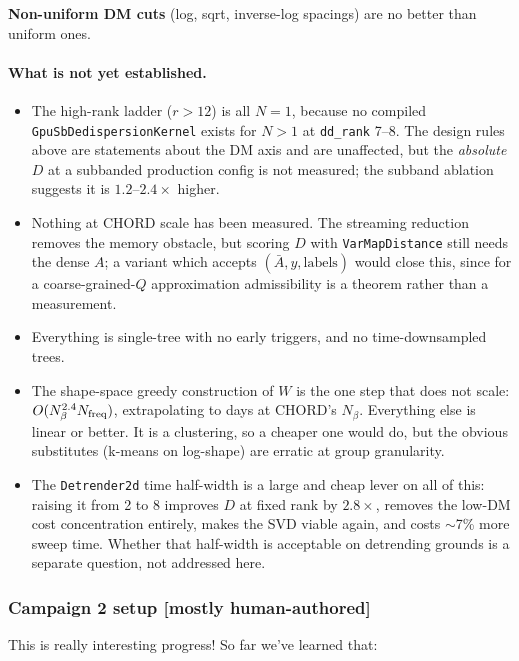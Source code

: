 \documentclass{article}
\numberwithin{equation}{section}   %
\begin{document}
{\bf Non-uniform DM cuts} (log, sqrt, inverse-log spacings) are no better than uniform ones.

\paragraph*{What is not yet established.}
\begin{itemize}
\item The high-rank ladder ($r > 12$) is all $N=1$, because no compiled
 {\tt GpuSbDedispersionKernel} exists for $N>1$ at {\tt dd\_rank} 7--8. The design rules above
 are statements about the DM axis and are unaffected, but the {\em absolute} $D$ at a subbanded
 production config is not measured; the subband ablation suggests it is $1.2$--$2.4\times$
 higher.
\item Nothing at CHORD scale has been measured. The streaming reduction removes the memory
 obstacle, but scoring $D$ with \verb|VarMapDistance| still needs the dense $A$; a variant which
 accepts $(\bar A, y, \mbox{labels})$ would close this, since for a coarse-grained-$Q$
 approximation admissibility is a theorem rather than a measurement.
\item Everything is single-tree with no early triggers, and no time-downsampled trees.
\item The shape-space greedy construction of $W$ is the one step that does not scale:
 $O(N_\beta^{2.4} N_{\rm freq})$, extrapolating to days at CHORD's $N_\beta$. Everything else is linear
 or better. It is a clustering, so a cheaper one would do, but the obvious substitutes
 (k-means on log-shape) are erratic at group granularity.
\item The {\tt Detrender2d} time half-width is a large and cheap lever on all of this: raising it
 from 2 to 8 improves $D$ at fixed rank by $2.8\times$, removes the low-DM cost concentration
 entirely, makes the SVD viable again, and costs $\sim$7\% more sweep time. Whether that
 half-width is acceptable on detrending grounds is a separate question, not addressed here.
\end{itemize}

\subsubsection{Campaign 2 setup [mostly human-authored]}
\label{ssec:campaign2_setup}

This is really interesting progress!
So far we've learned that:
\end{document}
